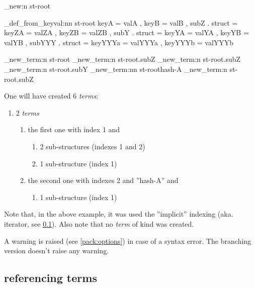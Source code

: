 \documentclass[10pt]{article}
\begin{document}
\begin{codestore}[store-env=keyval.demo2]
\starray_new:n {st-root}

\starray_def_from_keyval:nn {st-root} 
  {
    keyA = valA ,
    keyB = valB ,
    subZ . struct = 
      {
        keyZA = valZA ,
        keyZB = valZB ,
      }
    subY . struct =
      {
        keyYA = valYA ,
        keyYB = valYB ,
        subYYY . struct =
          {
            keyYYYa = valYYYa ,
            keyYYYb = valYYYb 
          }
      }
  }
  
\starray_new_term:n {st-root}
\starray_new_term:n {st-root.subZ}
\starray_new_term:n {st-root.subZ}
\starray_new_term:n {st-root.subY}
\starray_new_term:nn {st-root}{hash-A}
\starray_new_term:n {st-root.subZ}
\end{codestore}


One will have created 6 \textsl{terms}:
\begin{enumerate}[miditemsep]
\item 2  \textsl{terms}
  \begin{enumerate}[miditemsep]
  \item the first one with index 1 and
  \begin{enumerate}[miditemsep]
    \item 2 sub-structures  (indexes 1 and 2)
    \item 1 sub-structure  (index 1)
  \end{enumerate}
  \item the second one with indexes 2 and ''hash-A'' and
  \begin{enumerate}[miditemsep]
    \item 1 sub-structure  (index 1)
  \end{enumerate}
  \end{enumerate}
\end{enumerate}

Note that, in the above example, it was used the ''implicit'' indexing (aka. iterator, see \ref{pack:ref}). Also note that no \textsl{term} of kind  was created.

A warning is raised (see \ref{pack:options}) in case of a  syntax error. The branching version doesn't raise any warning.


\subsection{referencing terms}\label{pack:ref}
\end{document}
